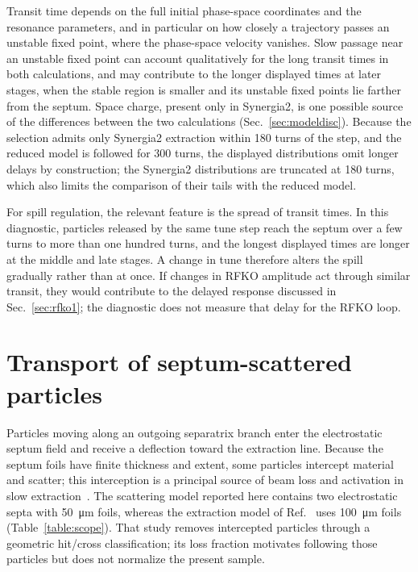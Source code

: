 \documentclass[a4paper,fleqn]{cas-sc}
\begin{document}
Transit time depends on the full initial phase-space coordinates and the resonance parameters, and in particular on how closely a trajectory passes an unstable fixed point, where the phase-space velocity vanishes. Slow passage near an unstable fixed point can account qualitatively for the long transit times in both calculations, and may contribute to the longer displayed times at later stages, when the stable region is smaller and its unstable fixed points lie farther from the septum. Space charge, present only in Synergia2, is one possible source of the differences between the two calculations (Sec.~\ref{sec:modeldisc}). Because the selection admits only Synergia2 extraction within 180 turns of the step, and the reduced model is followed for 300 turns, the displayed distributions omit longer delays by construction; the Synergia2 distributions are truncated at 180 turns, which also limits the comparison of their tails with the reduced model.

For spill regulation, the relevant feature is the spread of transit times. In this diagnostic, particles released by the same tune step reach the septum over a few turns to more than one hundred turns, and the longest displayed times are longer at the middle and late stages. A change in tune therefore alters the spill gradually rather than at once. If changes in RFKO amplitude act through similar transit, they would contribute to the delayed response discussed in Sec.~\ref{sec:rfko1}; the diagnostic does not measure that delay for the RFKO loop.

\section{\label{sec:beamloss}Transport of septum-scattered particles}

Particles moving along an outgoing separatrix branch enter the electrostatic septum field and receive a deflection toward the extraction line. Because the septum foils have finite thickness and extent, some particles intercept material and scatter; this interception is a principal source of beam loss and activation in slow extraction~\cite{velotti}. The scattering model reported here contains two electrostatic septa with \SI{50}{\micro\metre} foils, whereas the extraction model of Ref.~\cite{mu2e} uses \SI{100}{\micro\metre} foils (Table~\ref{table:scope}). That study removes intercepted particles through a geometric hit/cross classification; its loss fraction motivates following those particles but does not normalize the present sample.
\end{document}
